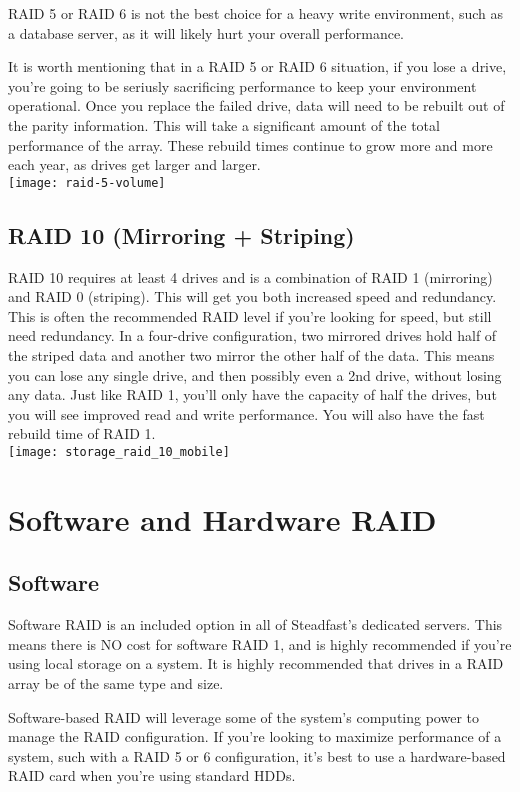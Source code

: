 \documentclass{article}
\begin{document}
RAID 5 or RAID 6 is not the best choice for a heavy write environment, such as a database server, as it will likely hurt your overall performance. 

It is worth mentioning that in a RAID 5 or RAID 6 situation, if you lose a drive, you’re going to be seriusly sacrificing performance to keep your environment operational. Once you replace the failed drive, data will need to be rebuilt out of the parity information. This will take a significant amount of the total performance of the array. These rebuild times continue to grow more and more each year, as drives get larger and larger.\\
\texttt{[image: raid-5-volume]} 


\subsection{RAID 10 (Mirroring + Striping)}
RAID 10 requires at least 4 drives and is a combination of RAID 1 (mirroring) and RAID 0 (striping). This will get you both increased speed and redundancy. This is often the recommended RAID level if you're looking for speed, but still need redundancy. In a four-drive configuration, two mirrored drives hold half of the striped data and another two mirror the other half of the data. This means you can lose any single drive, and then possibly even a 2nd drive, without losing any data. Just like RAID 1, you'll only have the capacity of half the drives, but you will see improved read and write performance. You will also have the fast rebuild time of RAID 1.\\
\texttt{[image: storage\_raid\_10\_mobile]} 


\section{Software and Hardware RAID}

\subsection{Software}
Software RAID is an included option in all of Steadfast’s dedicated servers. This means there is NO cost for software RAID 1, and is highly recommended if you’re using local storage on a system. It is highly recommended that drives in a RAID array be of the same type and size.

Software-based RAID will leverage some of the system’s computing power to manage the RAID configuration. If you’re looking to maximize performance of a system, such with a RAID 5 or 6 configuration, it’s best to use a hardware-based RAID card when you’re using standard HDDs.
\end{document}
